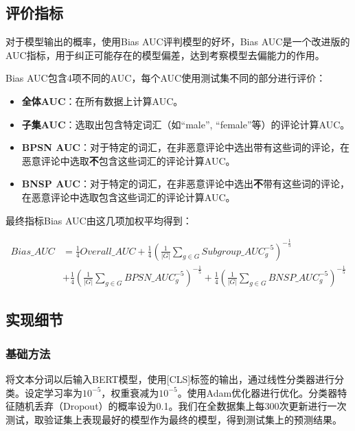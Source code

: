\subsection{评价指标}

对于模型输出的概率，使用Bias AUC评判模型的好坏，Bias AUC是一个改进版的AUC指标，用于纠正可能存在的模型偏差，达到考察模型去偏能力的作用。

Bias AUC包含4项不同的AUC，每个AUC使用测试集不同的部分进行评价：

\begin{itemize}
    \item {\bf 全体AUC}：在所有数据上计算AUC。
    \item {\bf 子集AUC}：选取出包含特定词汇（如``male'', ``female''等）的评论计算AUC。
    \item {\bf BPSN AUC}：对于特定的词汇，在非恶意评论中选出带有这些词的评论，在恶意评论中选取\textbf{不}包含这些词汇的评论计算AUC。
    \item {\bf BNSP AUC}：对于特定的词汇，在非恶意评论中选出\textbf{不}带有这些词的评论，在恶意评论中选取包含这些词汇的评论计算AUC。
\end{itemize}

最终指标Bias AUC由这几项加权平均得到：

\begin{equation}
\begin{aligned}
     Bias\_AUC &= \frac{1}{4} Overall\_AUC + \frac{1}{4}(\frac{1}{|G|}\sum_{g\in G}Subgroup\_AUC_g^{-5})^{-\frac{1}{5}} \\
     &+ \frac{1}{4}(\frac{1}{|G|}\sum_{g\in G}BPSN\_AUC_g^{-5})^{-\frac{1}{5}} + \frac{1}{4}(\frac{1}{|G|}\sum_{g\in G}BNSP\_AUC_g^{-5})^{-\frac{1}{5}}
\end{aligned}
\end{equation}

\subsection{实现细节}

\subsubsection{基础方法}

将文本分词以后输入BERT模型，使用[CLS]标签的输出，通过线性分类器进行分类。设定学习率为$10^{-5}$，权重衰减为$10^{-5}$。使用Adam优化器进行优化。分类器特征随机丢弃（Dropout）的概率设为0.1。我们在全数据集上每300次更新进行一次测试，取验证集上表现最好的模型作为最终的模型，得到测试集上的预测结果。

